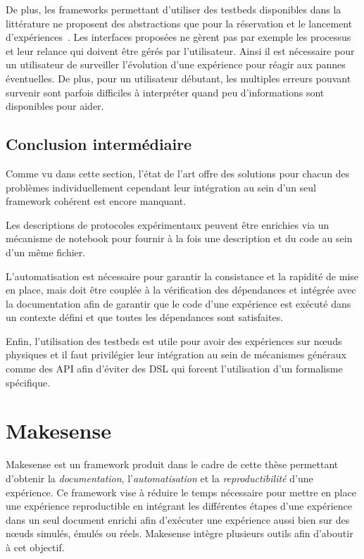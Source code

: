 De plus, les frameworks permettant d'utiliser des testbeds disponibles dans la littérature ne proposent des abstractions que pour la réservation et le lancement d'expériences~\cite{auge2014tools,baron2012towards}.
Les interfaces proposées ne gèrent pas par exemple les processus et leur relance qui doivent être gérés par l'utilisateur.
Ainsi il est nécessaire pour un utilisateur de surveiller l'évolution d'une expérience pour réagir aux pannes éventuelles.
De plus, pour un utilisateur débutant, les multiples erreurs pouvant survenir sont parfois difficiles à interpréter quand peu d'informations sont disponibles pour aider.

\subsection*{Conclusion intermédiaire}

Comme vu dans cette section, l'état de l'art offre des solutions pour chacun des problèmes individuellement cependant leur intégration au sein d'un seul framework cohérent est encore manquant.

Les descriptions de protocoles expérimentaux peuvent être enrichies via un mécanisme de notebook pour fournir à la fois une description et du code au sein d'un même fichier.

L'automatisation est nécessaire pour garantir la consistance et la rapidité de mise en place, mais doit être couplée à la vérification des dépendances et intégrée avec la documentation afin de garantir que le code d'une expérience est exécuté dans un contexte défini et que toutes les dépendances sont satisfaites.

Enfin, l'utilisation des testbeds est utile pour avoir des expériences sur nœuds physiques et il faut privilégier leur intégration au sein de mécanismes généraux comme des \ac{API} afin d'éviter des \ac{DSL} qui forcent l'utilisation d'un formalisme spécifique.

\section{Makesense}
\label{makesense:makesense}

Makesense est un framework produit dans le cadre de cette thèse permettant d'obtenir la \emph{documentation}, l'\emph{automatisation} et la \emph{reproductibilité} d'une expérience.
Ce framework vise à réduire le temps nécessaire pour mettre en place une expérience reproductible en intégrant les différentes étapes d'une expérience dans un seul document enrichi afin d'exécuter une expérience aussi bien sur des nœuds simulés, émulés ou réels.
Makesense intègre plusieurs outils afin d'aboutir à cet objectif.

